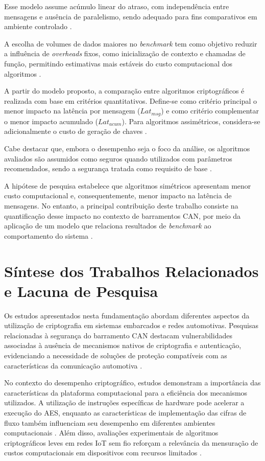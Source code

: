 Esse modelo assume acúmulo linear do atraso, com independência entre mensagens e ausência de paralelismo, sendo adequado para fins comparativos em ambiente controlado \cite{morgan1984discrete}.

A escolha de volumes de dados maiores no \textit{benchmark} tem como objetivo reduzir a influência de \textit{overheads} fixos, como inicialização de contexto e chamadas de função, permitindo estimativas mais estáveis do custo computacional dos algoritmos \cite{hennessy2011computer}.

A partir do modelo proposto, a comparação entre algoritmos criptográficos é realizada com base em critérios quantitativos. Define-se como critério principal o menor impacto na latência por mensagem ($Lat_{msg}$) e como critério complementar o menor impacto acumulado ($Lat_{acum}$). Para algoritmos assimétricos, considera-se adicionalmente o custo de geração de chaves \cite{goyal2022energy}.

Cabe destacar que, embora o desempenho seja o foco da análise, os algoritmos avaliados são assumidos como seguros quando utilizados com parâmetros recomendados, sendo a segurança tratada como requisito de base \cite{ferguson2011cryptography}.

A hipótese de pesquisa estabelece que algoritmos simétricos apresentam menor custo computacional e, consequentemente, menor impacto na latência de mensagens. No entanto, a principal contribuição deste trabalho consiste na quantificação desse impacto no contexto de barramentos CAN, por meio da aplicação de um modelo que relaciona resultados de \textit{benchmark} ao comportamento do sistema \cite{henia2005system}.


\section{Síntese dos Trabalhos Relacionados e Lacuna de Pesquisa}

Os estudos apresentados nesta fundamentação abordam diferentes aspectos da utilização de criptografia em sistemas embarcados e redes automotivas. Pesquisas relacionadas à segurança do barramento CAN destacam vulnerabilidades associadas à ausência de mecanismos nativos de criptografia e autenticação, evidenciando a necessidade de soluções de proteção compatíveis com as características da comunicação automotiva \cite{bozdal2020evaluation,lotto2024survey}.

No contexto do desempenho criptográfico, estudos demonstram a importância das características da plataforma computacional para a eficiência dos mecanismos utilizados. A utilização de instruções específicas de hardware pode acelerar a execução do AES, enquanto as características de implementação das cifras de fluxo também influenciam seu desempenho em diferentes ambientes computacionais \cite{gueron2010intel,manifavas2016survey}. Além disso, avaliações experimentais de algoritmos criptográficos leves em redes IoT sem fio reforçam a relevância da mensuração de custos computacionais em dispositivos com recursos limitados \cite{blanc2022benchmarking}.

